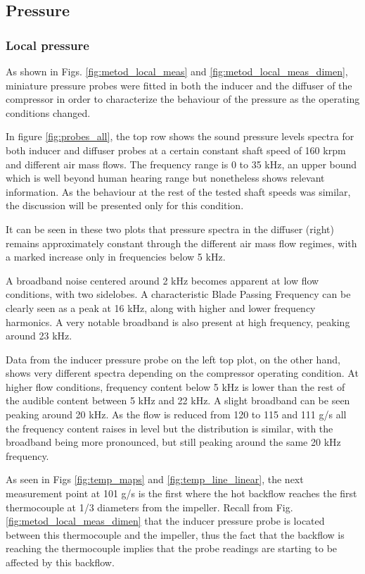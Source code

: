 \subsection{Pressure}
\label{sub:pressure}

\subsubsection{Local pressure}

As shown in Figs. \ref{fig:metod_local_meas} and \ref{fig:metod_local_meas_dimen}, miniature pressure probes were fitted in both the inducer and the diffuser of the compressor in order to characterize the behaviour of the pressure as the operating conditions changed.

In figure \ref{fig:probes_all}, the top row shows the sound pressure levels spectra for both inducer and diffuser probes at a certain constant shaft speed of 160 krpm and different air mass flows. The frequency range is 0 to 35 kHz, an upper bound which is well beyond human hearing range but nonetheless shows relevant information. As the behaviour at the rest of the tested shaft speeds was similar, the discussion will be presented only for this condition.

It can be seen in these two plots that pressure spectra in the diffuser (right) remains approximately constant through the different air mass flow regimes, with a marked increase only in frequencies below 5 kHz.

A broadband noise centered around 2 kHz becomes apparent at low flow conditions, with two sidelobes. A characteristic Blade Passing Frequency can be clearly seen as a peak at 16 kHz, along with higher and lower frequency harmonics. A very notable broadband is also present at high frequency, peaking around 23 kHz.

Data from the inducer pressure probe on the left top plot, on the other hand, shows very different spectra depending on the compressor operating condition. At higher flow conditions, frequency content below 5 kHz is lower than the rest of the audible content between 5 kHz and 22 kHz. A slight broadband can be seen peaking around 20 kHz. As the flow is reduced from 120 to 115 and 111 g/s all the frequency content raises in level but the distribution is similar, with the broadband being more pronounced, but still peaking around the same 20 kHz frequency.

As seen in Figs \ref{fig:temp_maps} and \ref{fig:temp_line_linear}, the next measurement point at 101 g/s is the first where the hot backflow reaches the first thermocouple at 1/3 diameters from the impeller. Recall from Fig. \ref{fig:metod_local_meas_dimen} that the inducer pressure probe is located between this thermocouple and the impeller, thus the fact that the backflow is reaching the thermocouple implies that the probe readings are starting to be affected by this backflow.

